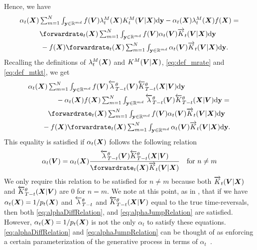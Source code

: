 Hence, we have 
\begin{align}
    &\textstyle \alpha_t(\mX)  \inty f(\mV) \mrate_t(\mX) \mtk_t(\mV | \mX) \rmd \y - \alpha_t(\mX) \mrate_t(\mX) f(\mX) = \\
    &\textstyle  \hspace{1cm} \forwardrate_t(\mX) \inty f(\mV) \alpha_t(\mV) \ftk_t(\mV | \mX) \rmd \y \\
  & \qquad \quad \textstyle - f(\mX) \forwardrate_t(\mX) \inty \alpha_t(\mV) \ftk_t(\mV | \mX) \rmd \y . 
\end{align}
Recalling the definitions of $\lambda^M_t({\bm{X}})$ and $K^{M}({\bm{V}} | {\bm{X}})$, \eqref{eq:def_mrate} and \eqref{eq:def_mtkt}, we get 
\begin{align}
  &\textstyle \alpha_t(\mX) \inty f(\mV) \backwardrate_{T-t}^\theta(\mV) \btk_{T-t}^\theta(\mX | \mV) \rmd \y \\
  & \qquad \qquad \textstyle - \alpha_t(\mX) f(\mX) \inty \backwardrate_{T-t}^\theta(\mV) \btk_{T-t}^\theta(\mX | \mV) \rmd \y = \\
  &\textstyle  \hspace{1cm} \forwardrate_t(\mX) \inty f(\mV) \alpha_t(\mV) \ftk_t(\mV | \mX) \rmd \y \\
  & \qquad \textstyle - f(\mX) \forwardrate_t(\mX) \inty \alpha_t(\mV) \ftk_t(\mV | \mX) \rmd \y .
\end{align}
This equality is satisfied if $\alpha_t({\bm{X}})$ follows the following relation
\begin{equation}
    \alpha_t(\mV) = \alpha_t(\mX) \frac{\backwardrate_{T-t}^\theta(\mV) \btk_{T-t}^\theta(\mX | \mV)}{\forwardrate_t(\mX) \ftk_t(\mV | \mX)} \quad \text{for } n \neq m
    \label{eq:alphaJumpRelation}
\end{equation}
We only require this relation to be satisfied for $n \neq m$ because both $\overrightarrow{K}_t({\bm{V}} | {\bm{X}})$ and $\overleftarrow{K}_{T-t}^\theta({\bm{X}} | {\bm{V}})$ are $0$ for $n = m$.
We note at this point, as in \citet{benton2022denoising}, that if we have $\alpha_t({\bm{X}}) = 1/p_t({\bm{X}})$ and $\overleftarrow{\lambda}_{T-t}^\theta$ and $\overleftarrow{K}_{T-t}^\theta({\bm{X}} | {\bm{V}})$ equal to the true time-reversals, then both \eqref{eq:alphaDiffRelation}, and \eqref{eq:alphaJumpRelation} are satisfied. However, $\alpha_t({\bm{X}}) = 1/p_t({\bm{X}})$ is not the only $\alpha_t$ to satisfy these equations. \eqref{eq:alphaDiffRelation} and \eqref{eq:alphaJumpRelation} can be thought of as enforcing a certain parameterization of the generative process in terms of $\alpha_t$~\citep{benton2022denoising}.


